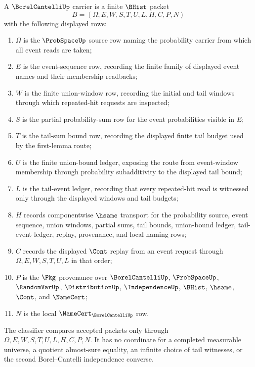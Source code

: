 \begin{definition}
\label{def:borel-cantelli-carrier}
A $\BorelCantelliUp$ carrier is a finite $\BHist$ packet
$$
B=(\Omega,E,W,S,T,U,L,H,C,P,N)
$$
with the following displayed rows:
\begin{enumerate}
\item $\Omega$ is the $\ProbSpaceUp$ source row naming the probability carrier from which all event reads are taken;
\item $E$ is the event-sequence row, recording the finite family of displayed event names and their membership readbacks;
\item $W$ is the finite union-window row, recording the initial and tail windows through which repeated-hit requests are inspected;
\item $S$ is the partial probability-sum row for the event probabilities visible in $E$;
\item $T$ is the tail-sum bound row, recording the displayed finite tail budget used by the first-lemma route;
\item $U$ is the finite union-bound ledger, exposing the route from event-window membership through probability subadditivity to the displayed tail bound;
\item $L$ is the tail-event ledger, recording that every repeated-hit read is witnessed only through the displayed windows and tail budgets;
\item $H$ records componentwise $\hsame$ transport for the probability source, event sequence, union windows, partial sums, tail bounds, union-bound ledger, tail-event ledger, replay, provenance, and local naming rows;
\item $C$ records the displayed $\Cont$ replay from an event request through $\Omega,E,W,S,T,U,L$ in that order;
\item $P$ is the $\Pkg$ provenance over $\BorelCantelliUp$, $\ProbSpaceUp$, $\RandomVarUp$, $\DistributionUp$, $\IndependenceUp$, $\BHist$, $\hsame$, $\Cont$, and $\NameCert$;
\item $N$ is the local $\NameCert_{\BorelCantelliUp}$ row.
\end{enumerate}
The classifier compares accepted packets only through $\Omega,E,W,S,T,U,L,H,C,P,N$. It has no coordinate for a completed measurable universe, a quotient almost-sure equality, an infinite choice of tail witnesses, or the second Borel--Cantelli independence converse.
\end{definition}

